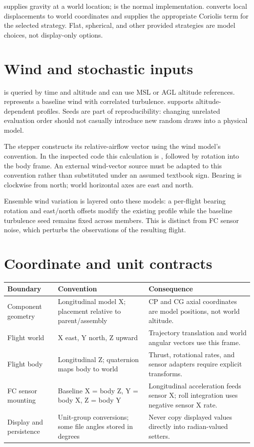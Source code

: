 supplies gravity at a world location;  is the normal implementation.  converts local displacements to world coordinates and supplies the appropriate Coriolis term for the selected strategy. Flat, spherical, and other provided strategies are model choices, not display-only options.

\section{Wind and stochastic inputs}
 is queried by time and altitude and can use MSL or AGL altitude references.  represents a baseline wind with correlated turbulence.  supports altitude-dependent profiles. Seeds are part of reproducibility: changing unrelated evaluation order should not casually introduce new random draws into a physical model.

The stepper constructs its relative-airflow vector using the wind model's convention. In the inspected code this calculation is , followed by rotation into the body frame. An external wind-vector source must be adapted to this convention rather than substituted under an assumed textbook sign. Bearing is clockwise from north; world horizontal axes are east and north.

Ensemble wind variation is layered onto these models: a per-flight bearing rotation and east/north offsets modify the existing profile while the baseline turbulence seed remains fixed across members. This is distinct from FC sensor noise, which perturbs the observations of the resulting flight.

\section{Coordinate and unit contracts}
\begin{tabularx}{\linewidth}{@{}L{3.3cm}YY@{}}\toprule
Boundary & Convention & Consequence\\\midrule
Component geometry & Longitudinal model X; placement relative to parent/assembly & CP and CG axial coordinates are model positions, not world altitude.\\
Flight world & X east, Y north, Z upward & Trajectory translation and world angular vectors use this frame.\\
Flight body & Longitudinal Z; quaternion maps body to world & Thrust, rotational rates, and sensor adapters require explicit transforms.\\
FC sensor mounting & Baseline X = body Z, Y = body X, Z = body Y & Longitudinal acceleration feeds sensor X; roll integration uses negative sensor X rate.\\
Display and persistence & Unit-group conversions; some file angles stored in degrees & Never copy displayed values directly into radian-valued setters.\\\bottomrule
\end{tabularx}

